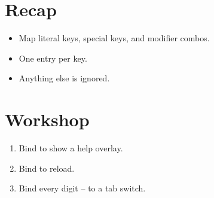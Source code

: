 \section{Recap}

\begin{recap}
\begin{itemize}[leftmargin=*]
  \item Map literal keys, special keys, and modifier combos.
  \item One entry per key.
  \item Anything else is ignored.
\end{itemize}
\end{recap}

\section*{Workshop}

\begin{enumerate}[leftmargin=*]
  \item Bind  to show a help overlay.
  \item Bind  to reload.
  \item Bind every digit -- to a tab switch.
\end{enumerate}
